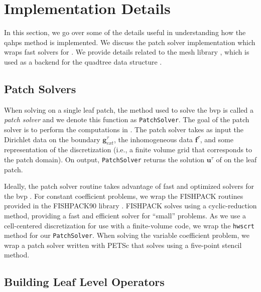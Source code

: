 \section{Implementation Details}
\label{sec:adaptivity}

In this section, we go over some of the details useful in understanding how the \gls{qahps} method is implemented. We discuss the patch solver implementation which wraps fast solvers for . We provide details related to the mesh library \pforest, which is used as a backend for the quadtree data structure \citep{burstedde2011p4est}.

\subsection{Patch Solvers}
\label{sub:patch_solvers}

When solving  on a single leaf patch, the method used to solve the \gls{bvp} is called a {\em patch solver} and we denote this function as \texttt{PatchSolver}. The goal of the patch solver is to perform the computations in . The patch solver takes as input the Dirichlet data on the boundary $\textbf{g}_{ext}^{\tau}$, the inhomogeneous data $\textbf{f}^{\tau}$, and some representation of the discretization (i.e., a finite volume grid that corresponds to the patch domain). On output, \texttt{PatchSolver} returns the solution $\textbf{u}^{\tau}$ of  on the leaf patch.

Ideally, the patch solver routine takes advantage of fast and optimized solvers for the \gls{bvp} . For constant coefficient problems, we wrap the FISHPACK routines \citep{swarztrauber1999fishpack} provided in the FISHPACK90 library \citep{adams2016fishpack90}. FISHPACK solves  using a cyclic-reduction method, providing a fast and efficient solver for ``small'' problems. As we use a cell-centered discretization for use with a finite-volume code, we wrap the \texttt{hwscrt} method for our \texttt{PatchSolver}. When solving the variable coefficient problem, we wrap a patch solver written with PETSc \citep{anl2023petsc} that solves  using a five-point stencil method.

\subsection{Building Leaf Level Operators}
\label{sub:building-leaf-level-operators}

